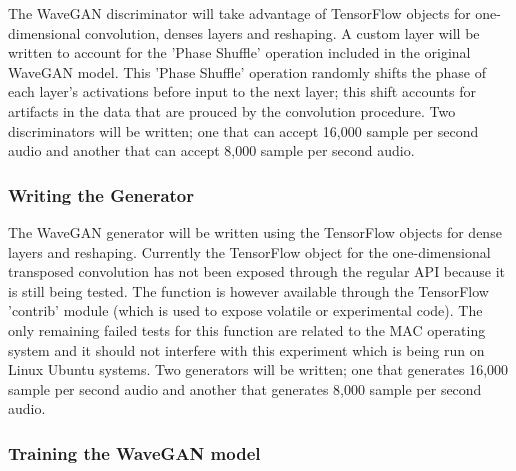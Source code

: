 \documentclass[a4paper, dvipsnames, titlepage]{article}
\begin{document}
The WaveGAN discriminator will take advantage of TensorFlow objects for one-dimensional convolution, denses layers and reshaping.
A custom layer will be written to account for the 'Phase Shuffle' operation included in the original WaveGAN model.
This 'Phase Shuffle' operation randomly shifts the phase of each layer's activations before input to the next layer; this shift accounts for artifacts in the data that are prouced by the convolution procedure.
Two discriminators will be written; one that can accept 16,000 sample per second audio and another that can accept 8,000 sample per second audio.

\subsubsection{Writing the Generator}

The WaveGAN generator will be written using the TensorFlow objects for dense layers and reshaping.
Currently the TensorFlow object for the one-dimensional transposed convolution has not been exposed through the regular API because it is still being tested.
The function is however available through the TensorFlow 'contrib' module (which is used to expose volatile or experimental code).
The only remaining failed tests for this function are related to the MAC operating system and it should not interfere with this experiment which is being run on Linux Ubuntu systems.
Two generators will be written; one that generates 16,000 sample per second audio and another that generates 8,000 sample per second audio.

\subsubsection{Training the WaveGAN model}
\end{document}
